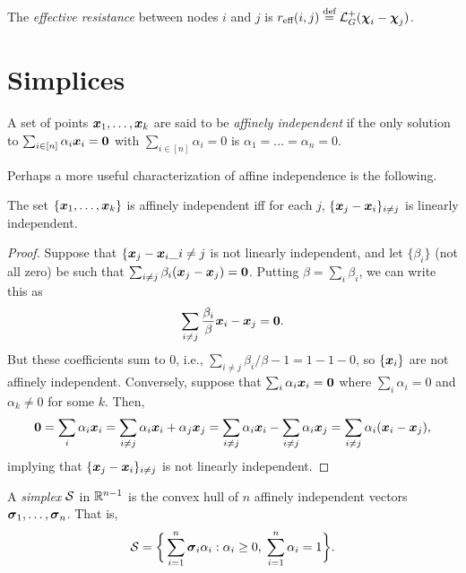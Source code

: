 \begin{definition}
	The \emph{effective resistance} between nodes $i$ and $j$ is $r_{\text{eff}}(i,j) \overset{\text{def}}{=} \mathcal{L}_G^+(\boldsymbol{\chi}_i-\boldsymbol{\chi}_j)$.  
\end{definition}



\section{Simplices}
\label{sec:simplices}

\begin{definition}
A set of points $\vb*{x}_1,\dots,\vb*{x}_k$ are said to be \emph{affinely independent} if the only solution to $\sum_{i\in[n]}\alpha_i\vb*{x}_i=\vb{0}$ with $\sum_{i\in [n]}\alpha_i=0$ is $\alpha_1=\dots=\alpha_n=0$. 
\end{definition}

Perhaps a more useful characterization of affine independence is the following. 

\begin{lemma}
	The set $\{\vb*{x}_1,\dots,\vb*{x}_k\}$ is affinely independent iff for each $j$, $\{\vb*{x}_j-\vb*{x}_i\}_{i\neq j}$ is linearly independent. 
\end{lemma}
\begin{proof}
	Suppose that $\{\vb*{x}_j-\vb*{x}_i\_{i\neq j}$ is not linearly independent, and let $\{\beta_i\}$ (not all zero) be such that $\sum_{i\neq j}\beta_i (\vb*{x}_j-\vb*{x}_j)=\vb{0}$. Putting $\beta=\sum_i \beta_i$, we can write this as 
	\[\sum_{i\neq j}\frac{\beta_i}{\beta}\vb*{x}_i - \vb*{x}_j=\vb{0}.\]
	But these coefficients sum to 0, i.e., $\sum_{i\neq j}\beta_i/\beta -1=1-1-0$, so $\{\vb*{x}_i\}$ are not affinely independent. Conversely, suppose that $\sum_i\alpha_i\vb*{x}_i=\vb{0}$ where $\sum_i\alpha_i=0$ and $\alpha_k\neq 0$ for some $k$. Then, 
	\[\vb{0} =\sum_i\alpha_i\vb*{x}_i = \sum_{i\neq j}\alpha_i\vb*{x}_i + \alpha_j\vb*{x}_j = \sum_{i\neq j}\alpha_i\vb*{x}_i - \sum_{i\neq j}\alpha_i\vb*{x}_j = \sum_{i\neq j}\alpha_i(\vb*{x}_i-\vb*{x}_j), \]
	implying that $\{\vb*{x}_j-\vb*{x}_i\}_{i\neq j}$ is not linearly independent. 
\end{proof}



\begin{definition}
A \emph{simplex} $\mathcal{S}$ in $\mathbb{R}^{n-1}$ is the convex hull of $n$ affinely independent vectors $\vb*{\sigma}_1,\dots,\vb*{\sigma}_n$. That is, 
\begin{equation*}
    \mathcal{S} = \bigg\{\sum_{i=1}^n \vb*{\sigma}_i \alpha_i: \alpha_i\geq 0,\; \sum_{i=1}^n \alpha_i=1\bigg\}. 
\end{equation*}
\end{definition}


